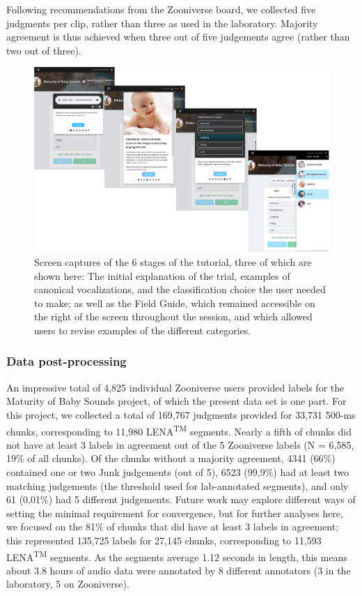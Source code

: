 \documentclass[english,,man]{apa6}
\begin{document}
Following recommendations from the Zooniverse board, we collected five judgments per clip, rather than three as used in the laboratory. Majority agreement is thus achieved when three out of five judgements agree (rather than two out of three).

\begin{figure}
\centering
\includegraphics{zooniverse-pufig.pdf}
\caption{\label{fig:fig-zoo}Screen captures of the 6 stages of the tutorial, three of which are shown here: The initial explanation of the trial, examples of canonical vocalizations, and the classification choice the user needed to make; as well as the Field Guide, which remained accessible on the right of the screen throughout the session, and which allowed users to revise examples of the different categories.}
\end{figure}

\hypertarget{data-post-processing}{%
\subsubsection{Data post-processing}\label{data-post-processing}}

An impressive total of 4,825 individual Zooniverse users provided labels for the Maturity of Baby Sounds project, of which the present data set is one part. For this project, we collected a total of 169,767 judgments provided for 33,731 500-ms chunks, corresponding to 11,980 LENA\textsuperscript{TM} segments. Nearly a fifth of chunks did not have at least 3 labels in agreement out of the 5 Zooniverse labels (N = 6,585, 19\% of all chunks). Of the chunks without a majority agreement, 4341 (66\%) contained one or two Junk judgements (out of 5), 6523 (99,9\%) had at least two matching judgements (the threshold used for lab-annotated segments), and only 61 (0,01\%) had 5 different judgements. Future work may explore different ways of setting the minimal requirement for convergence, but for further analyses here, we focused on the 81\% of chunks that did have at least 3 labels in agreement; this represented 135,725 labels for 27,145 chunks, corresponding to 11,593 LENA\textsuperscript{TM} segments. As the segments average 1.12 seconds in length, this means about 3.8 hours of audio data were annotated by 8 different annotators (3 in the laboratory, 5 on Zooniverse).
\end{document}

